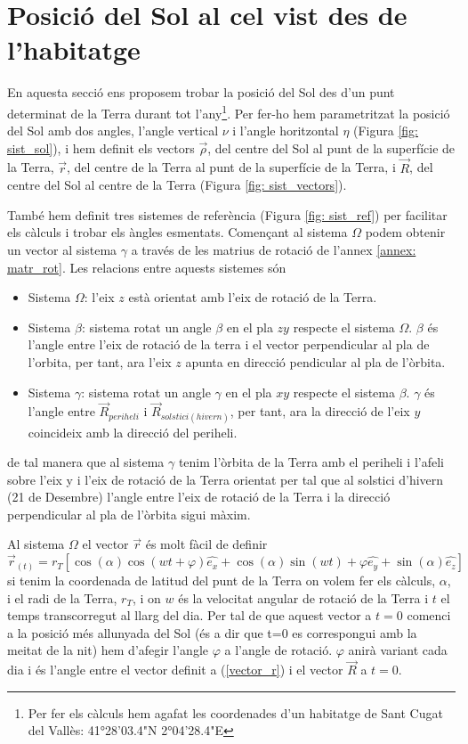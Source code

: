 \documentclass[11pt]{article}
\begin{document}
\section{Posició del Sol al cel vist des de l'habitatge} \label{sec: seccio_2}
En aquesta secció ens proposem trobar la posició del Sol des d'un punt determinat de la Terra durant tot l'any\footnote{\label{nota: habitatge}Per fer els càlculs hem agafat les coordenades d'un habitatge de Sant Cugat del Vallès: 41°28'03.4"N 2°04'28.4"E}. Per fer-ho hem parametritzat la posició del Sol amb dos angles, l'angle vertical $\nu$ i l'angle horitzontal $\eta$ (Figura \ref{fig: sist_sol}), i hem definit els vectors $\vec{\rho}$, del centre del Sol al punt de la superfície de la Terra, $\vec{r}$, del centre de la Terra al punt de la superfície de la Terra, i $\vec{R}$, del centre del Sol al centre de la Terra (Figura \ref{fig: sist_vectors}).

També hem definit tres sistemes de referència (Figura \ref{fig: sist_ref}) per facilitar els càlculs i trobar els àngles esmentats. Començant al sistema $\Omega$ podem obtenir un vector al sistema $\gamma$ a través de les matrius de rotació de l'annex \ref{annex: matr_rot}. Les relacions entre aquests sistemes són
\begin{itemize}
    \item Sistema $\Omega$: l'eix $z$ està orientat amb l'eix de rotació de la Terra.
    \item Sistema $\beta$: sistema rotat un angle $\beta$ en el pla $zy$ respecte el sistema $\Omega$. $\beta$ és l'angle entre l'eix de rotació de la terra i el vector perpendicular al pla de l'orbita, per tant, ara l'eix $z$ apunta en direcció pendicular al pla de l'òrbita.
    \item Sistema $\gamma$: sistema rotat un angle $\gamma$ en el pla $xy$ respecte el sistema $\beta$. $\gamma$ és l'angle entre $\vec{R}_{periheli}$ i $\vec{R}_{solstici(hivern)}$, per tant, ara la direcció de l'eix $y$ coincideix amb la direcció del periheli.
\end{itemize}
de tal manera que al sistema $\gamma$ tenim l'òrbita de la Terra amb el periheli i l'afeli sobre l'eix y i l'eix de rotació de la Terra orientat per tal que al solstici d'hivern (21 de Desembre) l'angle entre l'eix de rotació de la Terra i la direcció perpendicular al pla de l'òrbita sigui màxim.

Al sistema $\Omega$ el vector $\vec{r}$ és molt fàcil de definir 
\begin{equation}
    \vec{r}_{(t)}=r_T[\cos(\alpha)\cos(wt+\varphi)\hat{e_x}+\cos(\alpha)\sin(wt)+\varphi\hat{e_y}+\sin(\alpha)\hat{e_z}]
    \label{vector_r}
\end{equation}
si tenim la coordenada de latitud del punt de la Terra on volem fer els càlculs, $\alpha$, i el radi de la Terra, $r_T$, i on $w$ és la velocitat angular de rotació de la Terra i $t$ el temps transcorregut al llarg del dia.
Per tal de que aquest vector a $t=0$ comenci a la posició més allunyada del Sol (és a dir que t=0 es correspongui amb la meitat de la nit) hem d'afegir l'angle $\varphi$ a l'angle de rotació. $\varphi$ anirà variant cada dia i és l'angle entre el vector definit a (\ref{vector_r}) i el vector $\vec{R}$ a $t=0$.
\end{document}
